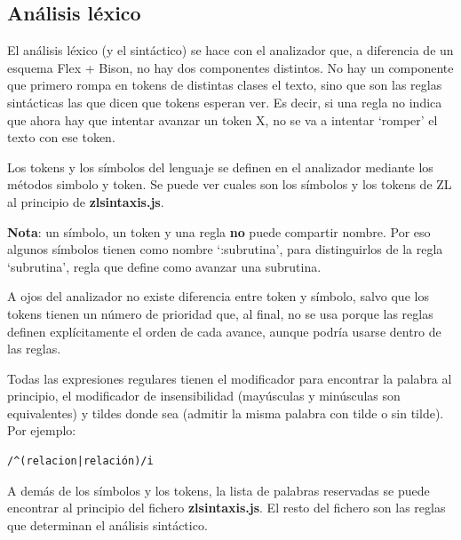 \documentclass{report}
\begin{document}
	
	\subsection{Análisis léxico}
	
	El análisis léxico (y el sintáctico) se hace con el analizador que, a diferencia de un esquema Flex + Bison, no hay dos componentes distintos. No hay un componente que primero rompa en tokens de distintas clases el texto, sino que son las reglas sintácticas las que dicen que tokens esperan ver. Es decir, si una regla no indica que ahora hay que intentar avanzar un token X, no se va a intentar `romper' el texto con ese token.
	
	Los tokens y los símbolos del lenguaje se definen en el analizador mediante los métodos simbolo y token. Se puede ver cuales son los símbolos y los tokens de ZL al principio de \textbf{zlsintaxis.js}. 
	
	\vspace{10px}
	\noindent
	\textbf{Nota}: un símbolo, un token y una regla \textbf{no} puede compartir nombre. Por eso algunos símbolos tienen como nombre `:subrutina', para distinguirlos de la regla `subrutina', regla que define como avanzar una subrutina.
	
	\vspace{10px}
	
	A ojos del analizador no existe diferencia entre token y símbolo, salvo que los tokens tienen un número de prioridad que, al final, no se usa porque las reglas definen explícitamente el orden de cada avance, aunque podría usarse dentro de las reglas. 

	\vspace{10px}
	
	Todas las expresiones regulares tienen el modificador para encontrar la palabra al principio, el modificador de insensibilidad (mayúsculas y minúsculas son equivalentes) y tildes donde sea (admitir la misma palabra con tilde o sin tilde). Por ejemplo: 
	
	\begin{BVerbatim}
/^(relacion|relación)/i
	\end{BVerbatim}

	\vspace{10px}
	
	A demás de los símbolos y los tokens, la lista de palabras reservadas se puede encontrar al principio del fichero \textbf{zlsintaxis.js}. El resto del fichero son las reglas que determinan el análisis sintáctico.
	
\end{document}
